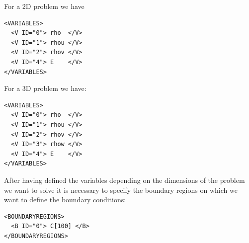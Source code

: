For a 2D problem we have
\begin{lstlisting}[style=XmlStyle]        
<VARIABLES>
  <V ID="0"> rho  </V>
  <V ID="1"> rhou </V>
  <V ID="2"> rhov </V>
  <V ID="4"> E    </V>
</VARIABLES>
\end{lstlisting}

For a 3D problem we have:
\begin{lstlisting}[style=XmlStyle]        
<VARIABLES>
  <V ID="0"> rho  </V>
  <V ID="1"> rhou </V>
  <V ID="2"> rhov </V>
  <V ID="3"> rhow </V>
  <V ID="4"> E    </V>
</VARIABLES>
\end{lstlisting}

After having defined the variables depending on the dimensions of the problem we want to solve
it is necessary to specify the boundary regions on which we want to define the boundary conditions:
\begin{lstlisting}[style=XmlStyle]        
<BOUNDARYREGIONS>
  <B ID="0"> C[100] </B>
</BOUNDARYREGIONS>
\end{lstlisting}

